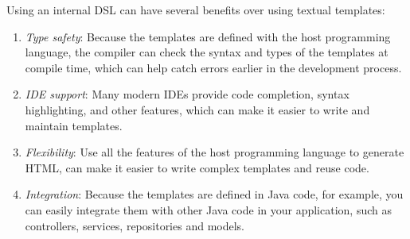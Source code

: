 Using an internal DSL can have several benefits over using textual templates:
\begin{enumerate}
  \item \emph{Type safety}: Because the templates are defined with the host
  programming language, the compiler can check the syntax and types of the
  templates at compile time, which can help catch errors earlier in the
  development process.

  \item \emph{IDE support}: Many modern IDEs provide code completion, syntax
  highlighting, and other features, which can make it easier to write and
  maintain templates.

  \item \emph{Flexibility}: Use all the features of the host programming language
  to generate HTML, can make it easier to write complex templates and reuse code.

  \item \emph{Integration}: Because the templates are defined in Java code, for
  example, you can easily integrate them with other Java code in your
  application, such as controllers, services, repositories and models.

\end{enumerate}

